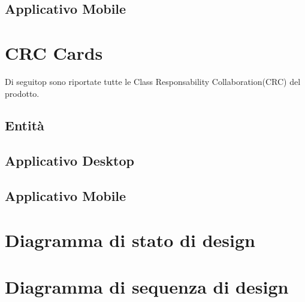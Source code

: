 \subsection{Applicativo Mobile}
\section{CRC  Cards}
Di seguitop sono riportate tutte le Class Responsability Collaboration(CRC) del prodotto.

\subsection{Entità}
    
     
    
    
\subsection{Applicativo Desktop}
    
    
    
    
    
    
    
    
    
    
    
    
    \pagebreak
\subsection{Applicativo Mobile}
    
    
    
    
    
    
    
    
\section{Diagramma di stato di design}

\section{Diagramma di sequenza di design}
